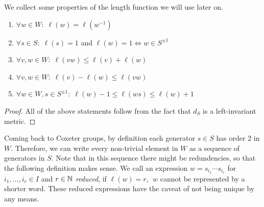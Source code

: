 \begin{lemma}
    We collect some properties of the length function we will use later on.
    \begin{enumerate}
        \item \(\forall w\in W:\; \ell(w) = \ell(w^{-1})\)
        \item \(\forall s\in S:\; \ell(s) = 1\) and \(\ell(w) = 1 \iff w\in S^{\pm 1}\)
        \item \(\forall v,w\in W:\; \ell(vw)\leq\ell(v)+\ell(w)\)
        \item \(\forall v,w\in W:\; \ell(v)-\ell(w)\leq\ell(vw)\)
        \item \(\forall w\in W, s\in S^{\pm 1}:\; \ell(w)-1\leq\ell(ws)\leq\ell(w)+1\)
    \end{enumerate}
\end{lemma}
\begin{proof}
    All of the above statements follow from the fact that \(d_S\) is a left-invariant metric.
\end{proof}

Coming back to Coxeter groups, by definition each generator \(s\in S\) has order 2 in \(W\).
Therefore, we can write every non-trivial element in \(W\) as a sequence of generators in \(S\).
Note that in this sequence there might be redundencies, so that the following definition makes sense.
We call an expression \(w = s_{i_1} \cdots s_{i_r}\) for \(i_1,\ldots, i_r\in I\) and \(r\in\mathbb{N}\) \emph{reduced}, if \(\ell(w) = r\), \ie \(\;w\) cannot be represented by a shorter word.
These reduced expressions have the caveat of not being unique by any means.

